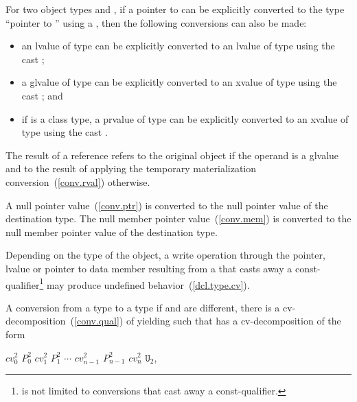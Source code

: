 \pnum
For two object types  and , if a pointer to  can
be explicitly converted to the type ``pointer to '' using a
, then the following conversions can also be made:

\begin{itemize}
\item an lvalue of type  can be explicitly converted to an lvalue
of type  using the cast ;

\item a glvalue of type  can be explicitly converted to an xvalue
of type  using the cast ; and

\item if  is a class type, a prvalue of type  can be
explicitly converted to an xvalue of type  using the cast
.
\end{itemize}

The result of a reference  refers
to the original object if the operand is a glvalue and
to the result of applying the temporary materialization conversion~(\ref{conv.rval}) otherwise.

\pnum
A null pointer value~(\ref{conv.ptr}) is converted to the null pointer
value of the destination type. The null member pointer
value~(\ref{conv.mem}) is converted to the null member pointer value of
the destination type.

\pnum
\begin{note}
Depending on the type of the object, a write operation through the
pointer, lvalue or pointer to data member resulting from a
 that casts away a const-qualifier\footnote{
is not limited to conversions that cast away a
const-qualifier.}
may produce undefined behavior~(\ref{dcl.type.cv}).
\end{note}

\pnum
{}%
A conversion from a type  to a type 
if  and  are different,
there is a cv-decomposition~(\ref{conv.qual}) of 
yielding  such that
 has a cv-decomposition of the form

\begin{indented}
$cv_0^2$ $P_0^2$ $cv_1^2$ $P_1^2$ $\cdots$ $cv_{n-1}^2$ $P_{n-1}^2$ $cv_n^2$ $\mathtt{U}_2$,
\end{indented}

